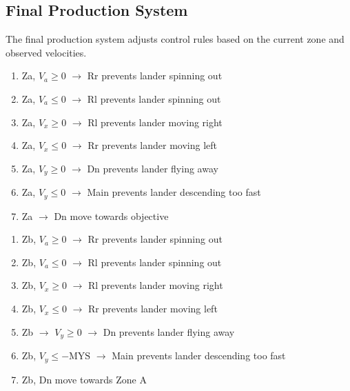 \documentclass{article}
\begin{document}
\subsection{Final Production System}
The final production system adjusts control rules based on the current zone and observed velocities. 
\\

\begin{enumerate}
    \item Za, $V_a \geq 0$ $\rightarrow$ Rr \hfill prevents lander spinning out
    \item Za, $V_a \leq 0$ $\rightarrow$ Rl \hfill prevents lander spinning out
    \item Za, $V_x \geq 0$ $\rightarrow$ Rl \hfill prevents lander moving right
    \item Za, $V_x \leq 0$ $\rightarrow$ Rr \hfill prevents lander moving left
    \item Za, $V_y \geq 0$ $\rightarrow$ Dn \hfill prevents lander flying away
    \item Za, $V_y \leq 0$ $\rightarrow$ Main \hfill prevents lander descending too fast
    \item Za $\rightarrow$ Dn \hfill move towards objective
\end{enumerate}
    
\begin{enumerate}
    \item Zb, $V_a \geq 0$ $\rightarrow$ Rr \hfill prevents lander spinning out
    \item Zb, $V_a \leq 0$ $\rightarrow$ Rl \hfill prevents lander spinning out
    \item Zb, $V_x \geq 0$ $\rightarrow$ Rl \hfill prevents lander moving right
    \item Zb, $V_x \leq 0$ $\rightarrow$ Rr \hfill prevents lander moving left
    \item Zb $\rightarrow$ $V_y \geq 0$ $\rightarrow$ Dn \hfill prevents lander flying away
    \item Zb, $V_y \leq -\text{MYS}$ $\rightarrow$ Main \hfill prevents lander descending too fast
    \item Zb, Dn \hfill move towards Zone A
\end{enumerate}
    
\end{document}
